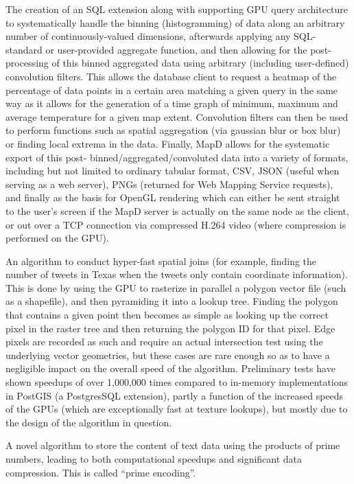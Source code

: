 \documentclass[twocolumn]{article}
\newcommand{\ii}{\item}
\begin{document}
\ii The creation of an SQL extension along with supporting GPU query architecture to systematically handle the binning (histogramming) of data along an arbitrary number of continuously-valued dimensions, afterwards applying any SQL-standard or user-provided aggregate function, and then allowing for the post-processing of this binned aggregated data
using arbitrary (including user-defined) convolution filters. This allows the database client to request a heatmap of the percentage of data points in a certain area matching a given query in the same way as it allows for the generation of a time graph of minimum, maximum and average temperature for a given map extent. Convolution filters can then be used to perform functions such as spatial aggregation (via gaussian blur or box blur) or finding local extrema in the data. Finally, MapD allows for the systematic export of this post- binned/aggregated/convoluted data into a variety of formats, including but not limited to ordinary tabular format, CSV, JSON (useful when serving as a web server), PNGs (returned for Web Mapping Service requests), and finally as the basis for OpenGL rendering which can either be sent straight to the user’s screen if the MapD server is actually on the same node as the client, or out over a TCP connection via compressed H.264 video (where compression is performed on the GPU).
\ii An algorithm to conduct hyper-fast spatial joins (for example, finding the number of tweets in Texas when the tweets only contain coordinate information). This is done by using the GPU to rasterize in parallel a polygon vector file (such as a shapefile), and then pyramiding it into a lookup tree. Finding the polygon that contains a given point then becomes as simple as looking up the correct pixel in the raster tree and then returning the polygon ID for that pixel. Edge pixels are recorded as such and require an actual intersection test using the underlying vector geometries, but these cases are rare enough so as to have a negligible impact on the overall speed of the algorithm. Preliminary tests have shown speedups of over 1,000,000 times compared to in-memory implementations in PostGIS (a PostgresSQL extension), partly a function of the increased speeds of the GPUs (which are exceptionally fast at texture lookups), but mostly due to the design of the algorithm in question.
\ii A novel algorithm to store the content of text data using the products of prime numbers, leading to both computational speedups and significant data compression. This is called “prime encoding”.
\end{document}
